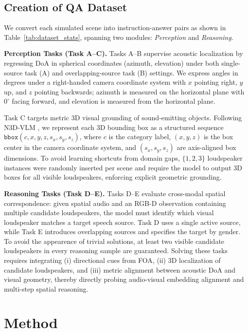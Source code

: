 \subsection{Creation of QA Dataset}

We convert each simulated scene into instruction-answer pairs as shown in Table~\ref{tab:dataset_stats}, spanning two modules: \textit{Perception} and \textit{Reasoning}.

\textbf{Perception Tasks (Task A--C).}
Tasks A--B supervise acoustic localization by regressing DoA in spherical coordinates (azimuth, elevation) under both single-source task (A) and overlapping-source task (B) settings.
We express angles in degrees under a right-handed camera coordinate system with $x$ pointing right, $y$ up, and $z$ pointing backwards; azimuth is measured on the horizontal plane with $0^\circ$ facing forward, and elevation is measured from the horizontal plane.

Task C targets metric 3D visual grounding of sound-emitting objects. 
Following N3D-VLM \cite{wang2025n3d}, we represent each 3D bounding box as a structured sequence $\texttt{bbox}(c, x, y, z, s_x, s_y, s_z)$, where $c$ is the category label, $(x,y,z)$ is the box center in the camera coordinate system, and $(s_x,s_y,s_z)$ are axis-aligned box dimensions. 
To avoid learning shortcuts from domain gaps, $\{1,2,3\}$ loudspeaker instances were randomly inserted per scene and require the model to output 3D boxes for all visible loudspeakers, enforcing explicit geometric grounding.

\textbf{Reasoning Tasks (Task D--E).}
Tasks D--E evaluate cross-modal spatial correspondence: given spatial audio and an RGB-D observation containing multiple candidate loudspeakers, the model must identify which visual loudspeaker matches a target speech source. 
Task D uses a single active source, while Task E introduces overlapping sources and specifies the target by gender. 
To avoid the appearence of trivial solutions, at least two visible candidate loudspeakers in every reasoning sample are guaranteed. 
Solving these tasks requires integrating (i) directional cues from FOA, (ii) 3D localization of candidate loudspeakers, and (iii) metric alignment between acoustic DoA and visual geometry, thereby directly probing audio-visual embedding alignment and multi-step spatial reasoning.
\section{Method}

